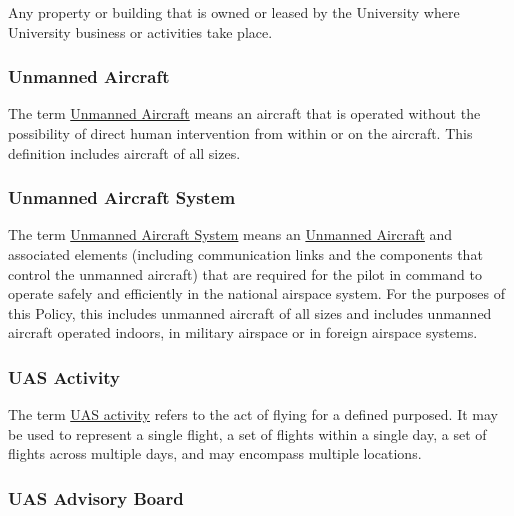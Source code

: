 \documentclass[
]{book}
\begin{document}
Any property or building that is owned or leased by the University where University business or activities take place.



\hypertarget{UA}{%
\subsubsection*{Unmanned Aircraft}\label{UA}}

The term \protect\hyperlink{UA}{Unmanned Aircraft} means an aircraft that is operated without the possibility of direct human intervention from within or on the aircraft. This definition includes aircraft of all sizes.





\hypertarget{UAS}{%
\subsubsection*{Unmanned Aircraft System}\label{UAS}}

The term \protect\hyperlink{UAS}{Unmanned Aircraft System} means an \protect\hyperlink{UA}{Unmanned Aircraft} and associated elements (including communication links and the components that control the unmanned aircraft) that are required for the pilot in command to operate safely and efficiently in the national airspace system. For the purposes of this Policy, this includes unmanned aircraft of all sizes and includes unmanned aircraft operated indoors, in military airspace or in foreign airspace systems.







\hypertarget{UASactivity}{%
\subsubsection*{UAS Activity}\label{UASactivity}}

The term \protect\hyperlink{UASactivity}{UAS activity} refers to the act of flying for a defined purposed. It may be used to represent a single flight, a set of flights within a single day, a set of flights across multiple days, and may encompass multiple locations.



\hypertarget{AB}{%
\subsubsection*{UAS Advisory Board}\label{AB}}
\end{document}
